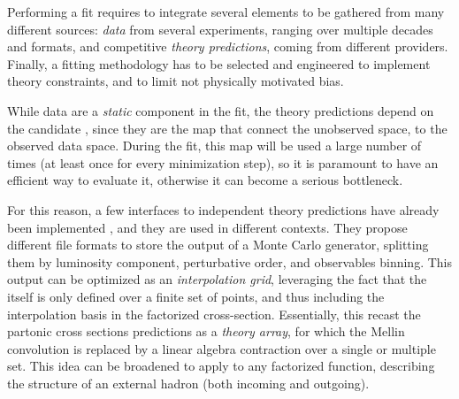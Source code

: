 
Performing a \pdf fit requires to integrate several elements to be gathered
from many different sources: \textit{data} from several experiments, ranging
over multiple decades and formats, and competitive \textit{theory predictions},
coming from different providers.
Finally, a fitting methodology has to be selected and engineered to implement
theory constraints, and to limit not physically motivated bias.

While data are a \textit{static} component in the fit, the theory predictions
depend on the candidate \pdf, since they are the map that connect the
unobserved \pdf space, to the observed data space.
During the fit, this map will be used a large number of times (at least once
for every minimization step), so it is paramount to have an efficient way to
evaluate it, otherwise it can become a serious bottleneck.

For this reason, a few interfaces to \pdf independent theory predictions have
already been implemented
\cite{Carli:2010rw,Britzger:2012bs,Britzger:2022lbf,Carrazza:2020gss}, and they
are used in different contexts.
They propose different file formats to store the output of a Monte Carlo
generator, splitting them by luminosity component, perturbative order, and
observables binning.
This output can be optimized as an \textit{interpolation grid}, leveraging the
fact that the \pdf itself is only defined over a finite set of points, and thus
including the interpolation basis in the factorized cross-section.
Essentially, this recast the partonic cross sections predictions as
a \textit{theory array}, for which the Mellin convolution is replaced by a
linear algebra contraction over a single or multiple \pdf set.
This idea can be broadened to apply to any factorized function, describing the
structure of an external hadron (both incoming and outgoing).

